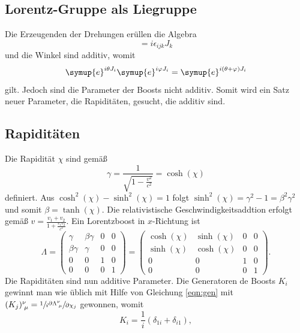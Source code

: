 \documentclass[
  captions=tableheading,  %
  titlepage=firstiscover, %
]{scrartcl}
\begin{document}
\subsection{Lorentz-Gruppe als Liegruppe}
Die Erzeugenden der Drehungen erüllen die Algebra 
\begin{equation*}
  [J_i, J_j] = i \epsilon_{ijk} J_k
\end{equation*}
und die Winkel sind additiv, womit 
\begin{equation*}
  \symup{e}^{i\theta J_i} \symup{e}^{i\varphi J_i} = \symup{e}^{i(\theta + \varphi) J_i}
\end{equation*}
gilt. 
Jedoch sind die Parameter der Boosts nicht additiv. 
Somit wird ein Satz neuer Parameter, die Rapiditäten, gesucht, die additiv sind.
\subsection{Rapiditäten}
Die Rapidität $\chi$ sind gemäß 
\begin{equation*}
  \gamma = \frac{1}{\sqrt{1 - \frac{v^2}{c^2}}} = \cosh(\chi)
\end{equation*}
definiert.
Aus $\cosh^2(\chi) - \sinh^2(\chi) = 1$ folgt $\sinh^2(\chi) = \gamma^2 - 1 = \beta^2\gamma^2$ und somit 
$\beta = \tanh (\chi)$.
Die relativistische Geschwindigkeitsaddtion erfolgt gemäß 
$v = \frac{v_1 + v_2}{1 + \frac{v_1 v_2 }{c^2}}$.
Ein Lorentzboost in $x$-Richtung ist 
\begin{equation*}
  \Lambda  =
  \begin{pmatrix}
    \gamma & \beta \gamma & 0 & 0 \\
    \beta \gamma & \gamma & 0 & 0\\
    0 & 0 & 1 & 0 \\
    0 & 0 & 0 & 1
  \end{pmatrix}
  = 
  \begin{pmatrix}
    \cosh (\chi) & \sinh (\chi) & 0 & 0 \\
    \sinh (\chi) & \cosh (\chi) & 0 & 0\\
    0 & 0 & 1 & 0 \\
    0 & 0 & 0 & 1
  \end{pmatrix}
  .
\end{equation*}
Die Rapiditäten sind nun additive Parameter.
Die Generatoren de Boosts $K_i$ gewinnt man wie üblich mit Hilfe von 
Gleichung \eqref{eqn:gen} mit $(K_j)_{\; \mu}^{\nu} = \sfrac{1}{i} \sfrac{\partial \Lambda_{\; \mu }^{\nu}}{\partial \chi_j} $ gewonnen, womit 
\begin{equation*}
  K_i= \frac{1}{i} (\delta_{1i} + \delta_{i1}),
\end{equation*}
\end{document}
